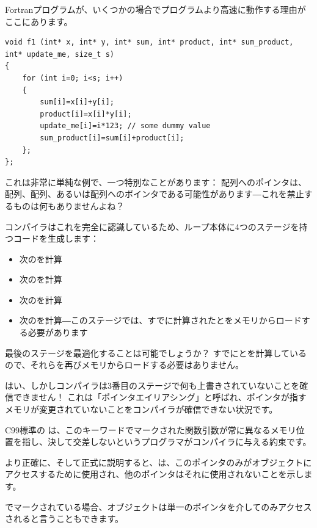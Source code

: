
Fortranプログラムが、いくつかの場合で\CCpp プログラムより高速に動作する理由がここにあります。

\begin{lstlisting}[style=customc]
void f1 (int* x, int* y, int* sum, int* product, int* sum_product, int* update_me, size_t s)
{
	for (int i=0; i<s; i++)
	{
		sum[i]=x[i]+y[i];
		product[i]=x[i]*y[i];
		update_me[i]=i*123; // some dummy value
		sum_product[i]=sum[i]+product[i];	
	};
};
\end{lstlisting}

これは非常に単純な例で、一つ特別なことがあります：
配列へのポインタは、配列、配列、あるいは配列へのポインタである可能性があります―これを禁止するものは何もありませんよね？

コンパイラはこれを完全に認識しているため、ループ本体に4つのステージを持つコードを生成します：
\begin{itemize}
\item 次のを計算
\item 次のを計算
\item 次のを計算
\item 次のを計算―このステージでは、すでに計算されたとをメモリからロードする必要があります
\end{itemize}

最後のステージを最適化することは可能でしょうか？
すでにとを計算しているので、それらを再びメモリからロードする必要はありません。

はい、しかしコンパイラは3番目のステージで何も上書きされていないことを確信できません！
これは「ポインタエイリアシング」と呼ばれ、ポインタが指すメモリが変更されていないことをコンパイラが確信できない状況です。

C99標準の は、このキーワードでマークされた関数引数が常に異なるメモリ位置を指し、決して交差しないというプログラマがコンパイラに与える約束です。

より正確に、そして正式に説明すると、は、このポインタのみがオブジェクトにアクセスするために使用され、他のポインタはそれに使用されないことを示します。

でマークされている場合、オブジェクトは単一のポインタを介してのみアクセスされると言うこともできます。

